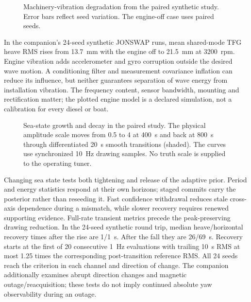 \documentclass[conference]{IEEEtran}
\newcommand{\IncludePGF}[1]{\resizebox{\linewidth}{!}{}}
\begin{document}
\begin{figure}[!t]\centering
\IncludePGF{../../reports/results/tfg_shared_modes/figures/engine_degradation.pgf}
\caption{Machinery-vibration degradation from the paired synthetic study.
Error bars reflect seed variation. The engine-off case uses paired seeds.}
\end{figure}
In the companion's 24-seed synthetic JONSWAP runs, mean shared-mode TFG
heave RMS rises from 13.7~mm with the engine off to 21.5~mm at 3200~rpm.
Engine vibration adds accelerometer and gyro corruption outside the desired
wave motion. A conditioning filter and measurement covariance inflation can
reduce its influence, but neither guarantees separation of wave energy from
installation vibration. The frequency content, sensor bandwidth, mounting and
rectification matter; the plotted engine model is a declared simulation,
not a calibration for every diesel or boat.

\begin{figure}[!t]\centering
\IncludePGF{../../reports/results/tfg_shared_modes/figures/roundtrip.pgf}
\caption{Sea-state growth and decay in the paired study. The physical amplitude
scale moves from 0.5 to 4 at 400~s and back at 800~s through differentiated
20~s smooth transitions (shaded). The curves use synchronized 10~Hz drawing
samples. No truth scale is supplied to the operating tuner.}
\end{figure}
Changing sea state tests both tightening and release of the adaptive prior.
Period and energy statistics respond at their own horizons; staged commits
carry the posterior rather than reseeding it. Fast confidence withdrawal
reduces stale cross-axis dependence during a mismatch, while slower recovery
requires renewed supporting evidence. Full-rate transient metrics precede
the peak-preserving drawing reduction. In the 24-seed synthetic round trip,
median heave/horizontal recovery times after the rise are 1/1~s. After the
fall they are 26/69~s. Recovery starts at the first of 20 consecutive 1~Hz
evaluations with trailing 10~s RMS at most 1.25 times the corresponding
post-transition reference RMS. All 24 seeds reach the criterion in each
channel and direction of change. The companion additionally examines
abrupt direction changes and magnetic outage/reacquisition; these tests do
not imply continued absolute yaw observability during an outage.
\end{document}
